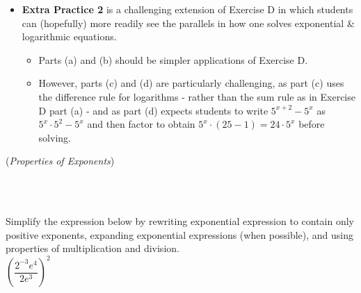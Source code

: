 \documentclass[10pt]{article}
\begin{document}
\begin{itemize}
\item {\bf\color{blue} Extra Practice 2} is a challenging extension of Exercise D in which students can (hopefully) more readily see the parallels in how one solves exponential \& logarithmic equations. 
    \begin{itemize}
    \item Parts (a) and (b) should be simpler applications of Exercise D. 
    \item However, parts (c) and (d) are particularly challenging, as part (c) uses the difference rule for logarithms - rather than the sum rule as in Exercise D part (a) - and as part (d) expects students to write $5^{x+2}-5^x$ as $5^{x}\cdot5^2 - 5^x$ and then factor to obtain $5^x\cdot(25-1)=24\cdot5^x$ before solving.
    \end{itemize}
\end{itemize}

\newpage%

\begin{center}
({\it Properties of Exponents})
\end{center}

\,\hfill
{}
\hfill
{}
\hfill
{}
\hfill
{}
\hfill
\,\\

\,\hfill\hfill
{}
\hfill
{}
\hfill
{}
\hfill\hfill\,



 Simplify the expression below by rewriting exponential expression to contain only positive exponents, expanding exponential expressions (when possible), and using properties of multiplication and division.\\

$\left( \dfrac{ 2^{-3}e^4 }{ 2e^3 } \right)^2$

{
\blue{\[\left( \dfrac{ 2^{-3}e^4 }{ 2e^3 } \right)^2 = \left( \dfrac{ e^{4-3} }{ 2\cdot2^{3} } \right)^2 = \left( \dfrac{ e }{ 2^{1+3} } \right)^2 = \left( \dfrac{ e }{ 2^4 } \right)\cdot\left( \dfrac{ e }{ 2^4 } \right) = \dfrac{ e^{1+1} }{ 2^{4+4} } = \fbox{$\dfrac{e^2}{2^8}$}\]
}}
\end{document}
